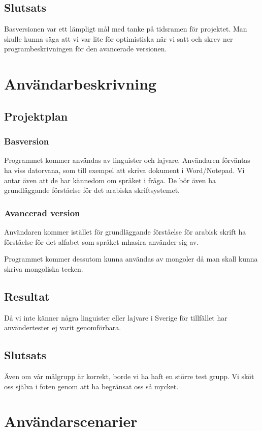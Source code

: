 \documentclass[a4paper,11p,twoside]{article}
\begin{document}
\subsection{Slutsats}
Basversionen var ett lämpligt mål med tanke på tidsramen för projektet. Man skulle kunna säga att vi var lite för optimistiska när vi satt och skrev ner programbeskrivningen för den avancerade versionen.

\section{Användarbeskrivning}
\subsection{Projektplan}
\subsubsection{Basversion}
Programmet kommer användas av linguister och lajvare. Användaren förväntas ha viss datorvana, som till exempel att skriva dokument i Word/Notepad. Vi antar även att de har kännedom om språket i fråga. De bör även ha grundläggande förståelse för det arabiska skriftsystemet. 

\subsubsection{Avancerad version}
Användaren kommer istället för grundläggande förståelse för arabisk skrift ha förståelse för det alfabet som språket mhasira använder sig av.

Programmet kommer dessutom kunna användas av mongoler då man skall kunna skriva mongoliska tecken.

\subsection{Resultat}
Då vi inte känner några linguister eller lajvare i Sverige för tillfället har användertester ej varit genomförbara. 

\subsection{Slutsats}
Även om vår målgrupp är korrekt, borde vi ha haft en större test grupp. Vi sköt oss själva i foten genom att ha begränsat oss så mycket.

\section{Användarscenarier}
\end{document}
